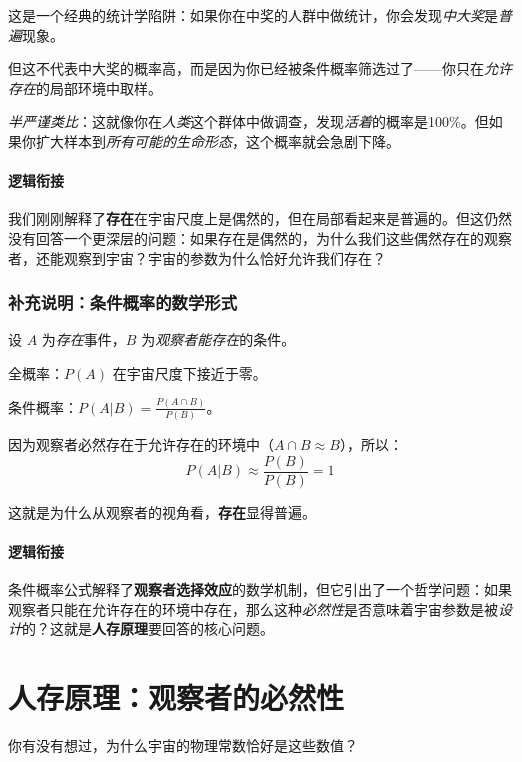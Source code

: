 \documentclass[openany, a4paper, 12pt]{book}
\begin{document}
	这是一个经典的统计学陷阱：如果你在中奖的人群中做统计，你会发现\textit{中大奖}是\textit{普遍}现象。

	但这不代表中大奖的概率高，而是因为你已经被条件概率筛选过了——你只在\textit{允许存在}的局部环境中取样。

	\textit{半严谨类比}：这就像你在\textit{人类}这个群体中做调查，发现\textit{活着}的概率是100\%。但如果你扩大样本到\textit{所有可能的生命形态}，这个概率就会急剧下降。

	\paragraph*{逻辑衔接}
	我们刚刚解释了\textbf{存在}在宇宙尺度上是偶然的，但在局部看起来是普遍的。但这仍然没有回答一个更深层的问题：如果存在是偶然的，为什么我们这些偶然存在的观察者，还能观察到宇宙？宇宙的参数为什么恰好允许我们存在？

	\subsubsection*{补充说明：条件概率的数学形式}
	\begin{tcolorbox}[
		colback=gray!5,
		colframe=gray!40,
		title=\small \textit{严谨推导（可跳过）},
		fonttitle=\bfseries
		]
		\small
		设 $A$ 为\textit{存在}事件，$B$ 为\textit{观察者能存在}的条件。

		全概率：$P(A)$ 在宇宙尺度下接近于零。

		条件概率：$P(A|B) = \frac{P(A \cap B)}{P(B)}$。

		因为观察者必然存在于允许存在的环境中（$A \cap B \approx B$），所以：
		\[ P(A|B) \approx \frac{P(B)}{P(B)} = 1 \]

		这就是为什么从观察者的视角看，\textbf{存在}显得普遍。
	\end{tcolorbox}

	\paragraph*{逻辑衔接}
	条件概率公式解释了\textbf{观察者选择效应}的数学机制，但它引出了一个哲学问题：如果观察者只能在允许存在的环境中存在，那么这种\textit{必然性}是否意味着宇宙参数是被\textit{设计}的？这就是\textbf{人存原理}要回答的核心问题。

	\section{人存原理：观察者的必然性}

	你有没有想过，为什么宇宙的物理常数恰好是这些数值？
\end{document}
